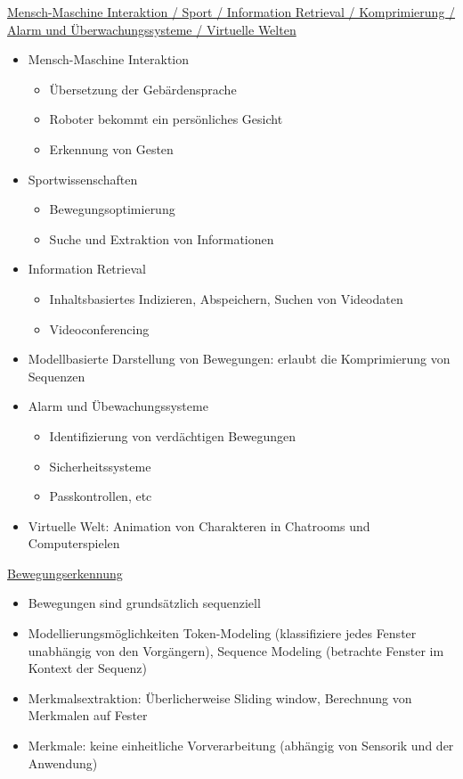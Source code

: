 \documentclass[a4paper,10pt,oneside]{article}
\begin{document}
\underline{Mensch-Maschine Interaktion / Sport / Information Retrieval / Komprimierung / Alarm und Überwachungssysteme / Virtuelle Welten} \\	
 	\begin{itemize}
 		\item Mensch-Maschine Interaktion
 			\begin{itemize}
 				\item Übersetzung der Gebärdensprache
 				\item Roboter bekommt ein persönliches Gesicht
 				\item Erkennung von Gesten
 			\end{itemize}
 		\item Sportwissenschaften
 			\begin{itemize}
 				\item Bewegungsoptimierung
 				\item Suche und Extraktion von Informationen
 			\end{itemize}
 		\item Information Retrieval
 			\begin{itemize}
 				\item Inhaltsbasiertes Indizieren, Abspeichern, Suchen von Videodaten
 				\item Videoconferencing
 			\end{itemize}
 		\item Modellbasierte Darstellung von Bewegungen: erlaubt die Komprimierung von Sequenzen 
 		\item Alarm und Übewachungssysteme
 			\begin{itemize}
 				\item Identifizierung von verdächtigen Bewegungen
 				\item Sicherheitssysteme 
 				\item Passkontrollen, etc
 			\end{itemize}
 		\item Virtuelle Welt: Animation von Charakteren in Chatrooms und Computerspielen 
 	\end{itemize}
 		
\underline{Bewegungserkennung} \\		
 	\begin{itemize}
 		\item Bewegungen sind grundsätzlich sequenziell
 		\item Modellierungsmöglichkeiten Token-Modeling (klassifiziere jedes Fenster unabhängig von den Vorgängern), Sequence Modeling (betrachte Fenster im Kontext der Sequenz)
 		\item Merkmalsextraktion: Überlicherweise Sliding window, Berechnung von Merkmalen auf Fester
 		\item Merkmale: keine einheitliche Vorverarbeitung (abhängig von Sensorik und der Anwendung)
 	\end{itemize}
 	
\end{document}
